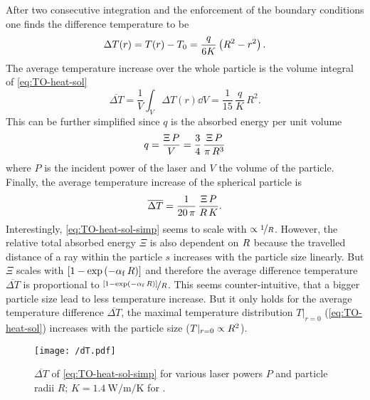 After two consecutive integration and the enforcement of the boundary 
conditions one finds the difference temperature to be
\begin{equation}
 \Delta T(r) = T(r) - T_{0} = \frac{q}{6K}\left(R^2 - r^{2} \right).
  \label{eq:TO-heat-sol}
\end{equation}
The average temperature increase over the whole particle is the volume integral 
of \cref{eq:TO-heat-sol}
\begin{equation}
  \overline{\Delta T} = \frac{1}{V}\int_{V}\Delta T(r) \dd{V} = 
  \frac{1}{15}\,\frac{q}{K}\,R^{2}.
  \label{eq:TO-heat-avg}
\end{equation}
This can be further simplified since $q$ is the absorbed energy per unit volume
\begin{equation}
  q = \frac{\Xi\,P}{V} = \frac{3}{4}\,\frac{\Xi\,P}{\pi\,R^{3}}
\end{equation}
where $P$ is the incident power of the laser and $V$ the volume of the 
particle. Finally, the average temperature increase of the spherical particle 
is
\begin{equation}
  \overline{\Delta T} = \frac{1}{20\,\pi}\,\frac{\Xi\,P}{R\,K}.
  \label{eq:TO-heat-sol-simp}
\end{equation}
Interestingly, \cref{eq:TO-heat-sol-simp} seems to scale with $\propto 
\nicefrac{1}{R}$. However, the relative total absorbed energy $\Xi$ is also 
dependent on $R$ because the travelled distance of a ray within the 
particle $s$ increases with the particle size linearly. But $\Xi$ scales with 
$\left[  1-\exp\left( -\alpha_{\mathrm{f}}\,R \right)\right]$ and therefore the 
average difference temperature $\overline{\Delta T}$ is proportional to 
$\nicefrac{\left[ 1-\exp\left( -\alpha_{\mathrm{f}}\,R \right) \right]}{R}$. This 
seems counter-intuitive, that a bigger particle size lead to less temperature 
increase. But it only holds for the average temperature difference 
$\overline{\Delta T}$, the maximal temperature distribution $T\vert_{r=0}$ 
(\cref{eq:TO-heat-sol}) increases with the particle size 
($T\vert_{r=0}\propto R^{2}$).

\begin{figure}[tbp]
  \centering
  \texttt{[image: /dT.pdf]}
  \caption{$\overline{\Delta T}$ of \cref{eq:TO-heat-sol-simp} for various 
  laser powers $P$ and particle radii $R$; 
$K=\SI{1.4}{\watt\per\meter\per\kelvin}$ for \SiO.}
  \label{fig:TO-dT}
\end{figure}


